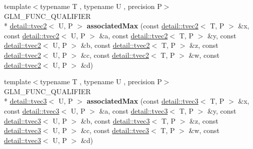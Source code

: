 \begin{DoxyCompactItemize}
\item 
\hypertarget{namespaceglm_ac54fada650fc6c4aef1745df3e1f05c8}{{\footnotesize template$<$typename T , typename U , precision P$>$ }\\G\-L\-M\-\_\-\-F\-U\-N\-C\-\_\-\-Q\-U\-A\-L\-I\-F\-I\-E\-R \\*
\hyperlink{structglm_1_1detail_1_1tvec2}{detail\-::tvec2}$<$ U, P $>$ {\bfseries associated\-Max} (const \hyperlink{structglm_1_1detail_1_1tvec2}{detail\-::tvec2}$<$ T, P $>$ \&x, const \hyperlink{structglm_1_1detail_1_1tvec2}{detail\-::tvec2}$<$ U, P $>$ \&a, const \hyperlink{structglm_1_1detail_1_1tvec2}{detail\-::tvec2}$<$ T, P $>$ \&y, const \hyperlink{structglm_1_1detail_1_1tvec2}{detail\-::tvec2}$<$ U, P $>$ \&b, const \hyperlink{structglm_1_1detail_1_1tvec2}{detail\-::tvec2}$<$ T, P $>$ \&z, const \hyperlink{structglm_1_1detail_1_1tvec2}{detail\-::tvec2}$<$ U, P $>$ \&c, const \hyperlink{structglm_1_1detail_1_1tvec2}{detail\-::tvec2}$<$ T, P $>$ \&w, const \hyperlink{structglm_1_1detail_1_1tvec2}{detail\-::tvec2}$<$ U, P $>$ \&d)}\label{namespaceglm_ac54fada650fc6c4aef1745df3e1f05c8}

\item 
\hypertarget{namespaceglm_a94f2f1b29419c238982bc7148e3e0d6d}{{\footnotesize template$<$typename T , typename U , precision P$>$ }\\G\-L\-M\-\_\-\-F\-U\-N\-C\-\_\-\-Q\-U\-A\-L\-I\-F\-I\-E\-R \\*
\hyperlink{structglm_1_1detail_1_1tvec3}{detail\-::tvec3}$<$ U, P $>$ {\bfseries associated\-Max} (const \hyperlink{structglm_1_1detail_1_1tvec3}{detail\-::tvec3}$<$ T, P $>$ \&x, const \hyperlink{structglm_1_1detail_1_1tvec3}{detail\-::tvec3}$<$ U, P $>$ \&a, const \hyperlink{structglm_1_1detail_1_1tvec3}{detail\-::tvec3}$<$ T, P $>$ \&y, const \hyperlink{structglm_1_1detail_1_1tvec3}{detail\-::tvec3}$<$ U, P $>$ \&b, const \hyperlink{structglm_1_1detail_1_1tvec3}{detail\-::tvec3}$<$ T, P $>$ \&z, const \hyperlink{structglm_1_1detail_1_1tvec3}{detail\-::tvec3}$<$ U, P $>$ \&c, const \hyperlink{structglm_1_1detail_1_1tvec3}{detail\-::tvec3}$<$ T, P $>$ \&w, const \hyperlink{structglm_1_1detail_1_1tvec3}{detail\-::tvec3}$<$ U, P $>$ \&d)}\label{namespaceglm_a94f2f1b29419c238982bc7148e3e0d6d}


\end{DoxyCompactItemize}
